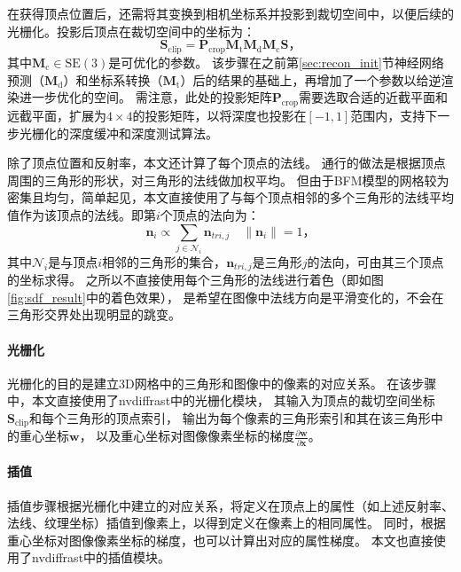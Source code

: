 在获得顶点位置后，还需将其变换到相机坐标系并投影到裁切空间中，以便后续的光栅化。投影后顶点在裁切空间中的坐标为：
\begin{equation}
\mathbf{S}_\mathrm{clip} = \mathbf{P}_\mathrm{crop}\mathbf{M}_\mathrm{t}\mathbf{M}_\mathrm{d}\mathbf{M}_\mathrm{c}\mathbf{S}
\text{，}
\end{equation}
其中$\mathbf{M}_\mathrm{c}\in \mathrm{SE(3)}$是可优化的参数。
该步骤在之前第\ref{sec:recon_init}节神经网络预测（$\mathbf{M}_\mathrm{d}$）和坐标系转换（$\mathbf{M}_\mathrm{t}$）后的结果的基础上，再增加了一个参数以给逆渲染进一步优化的空间。
需注意，此处的投影矩阵$\mathbf{P}_\mathrm{crop}$需要选取合适的近截平面和远截平面，扩展为$4\times 4$的投影矩阵，以将深度也投影在$[-1,1]$范围内，支持下一步光栅化的深度缓冲和深度测试算法。

除了顶点位置和反射率，本文还计算了每个顶点的法线。
通行的做法是根据顶点周围的三角形的形状，对三角形的法线做加权平均。
但由于BFM模型的网格较为密集且均匀，简单起见，本文直接使用了与每个顶点相邻的多个三角形的法线平均值作为该顶点的法线。即第$i$个顶点的法向为：
\begin{equation}
\mathbf{n}_i \propto \sum_{j\in\mathcal{N}_i}\mathbf{n}_{tri,j} \quad
\|\mathbf{n}_i\| = 1
\text{，}
\end{equation}
其中$\mathcal{N}_i$是与顶点$i$相邻的三角形的集合，$\mathbf{n}_{tri,j}$是三角形$j$的法向，可由其三个顶点的坐标求得。
之所以不直接使用每个三角形的法线进行着色（即如图\ref{fig:sdf_result}中的着色效果），
是希望在图像中法线方向是平滑变化的，不会在三角形交界处出现明显的跳变。

\paragraph{光栅化}
光栅化的目的是建立3D网格中的三角形和图像中的像素的对应关系。
在该步骤中，本文直接使用了nvdiffrast中的光栅化模块，
其输入为顶点的裁切空间坐标$\mathbf{S}_\mathrm{clip}$和每个三角形的顶点索引，
输出为每个像素的三角形索引和其在该三角形中的重心坐标$\mathbf{w}$，
以及重心坐标对图像像素坐标的梯度$\frac{\partial\mathbf{w}}{\partial\mathbf{x}}$。

\paragraph{插值}
插值步骤根据光栅化中建立的对应关系，将定义在顶点上的属性（如上述反射率、法线、纹理坐标）插值到像素上，以得到定义在像素上的相同属性。
同时，根据重心坐标对图像像素坐标的梯度，也可以计算出对应的属性梯度。
本文也直接使用了nvdiffrast中的插值模块。

